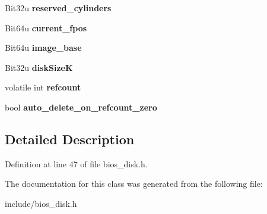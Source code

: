 \begin{DoxyCompactItemize}
\item 
\hypertarget{classimageDisk_a6588490a427230feac862942f34e401b}{Bit32u {\bfseries reserved\-\_\-cylinders}}\label{classimageDisk_a6588490a427230feac862942f34e401b}

\item 
\hypertarget{classimageDisk_afee451f676f8572279bc2354cead2bd9}{Bit64u {\bfseries current\-\_\-fpos}}\label{classimageDisk_afee451f676f8572279bc2354cead2bd9}

\item 
\hypertarget{classimageDisk_aa12b7c8c8b8bc9745dd93a10d13d89b9}{Bit64u {\bfseries image\-\_\-base}}\label{classimageDisk_aa12b7c8c8b8bc9745dd93a10d13d89b9}

\item 
\hypertarget{classimageDisk_a3a3603c680c9bbcf8206b13cf6d0f335}{Bit32u {\bfseries disk\-Size\-K}}\label{classimageDisk_a3a3603c680c9bbcf8206b13cf6d0f335}

\item 
\hypertarget{classimageDisk_a81222a3e8c9252b1737d13be03ca6bed}{volatile int {\bfseries refcount}}\label{classimageDisk_a81222a3e8c9252b1737d13be03ca6bed}

\item 
\hypertarget{classimageDisk_a94ba3581ff2159062036f478c41f889e}{bool {\bfseries auto\-\_\-delete\-\_\-on\-\_\-refcount\-\_\-zero}}\label{classimageDisk_a94ba3581ff2159062036f478c41f889e}

\end{DoxyCompactItemize}


\subsection{Detailed Description}


Definition at line 47 of file bios\-\_\-disk.\-h.



The documentation for this class was generated from the following file\-:\begin{DoxyCompactItemize}
\item 
include/bios\-\_\-disk.\-h\end{DoxyCompactItemize}
